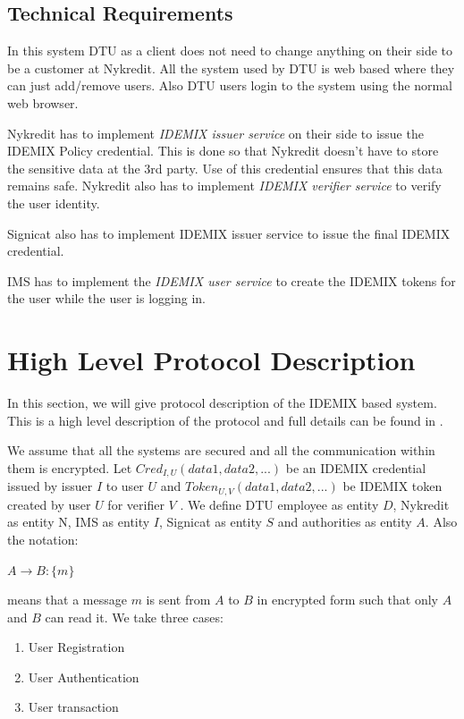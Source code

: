 \subsection{Technical Requirements}
In this system DTU as a client does not need to change anything on their side to be a customer at Nykredit. All the system used by DTU is web based where they can just add/remove users. Also DTU users login to the system using the normal web browser.

Nykredit has to implement \textit{IDEMIX issuer service}\cite{camenisch2002design} on their side to issue the IDEMIX Policy credential. This is done so that Nykredit doesn’t have to store the sensitive data at the 3rd party. Use of this credential ensures that this data remains safe. Nykredit also has to implement \textit{IDEMIX verifier service} to verify the user identity.

Signicat also has to implement IDEMIX issuer service to issue the final IDEMIX credential.

IMS has to implement the \textit{IDEMIX user service} to create the IDEMIX tokens for the user while the user is logging in.
\section{High Level Protocol Description}
In this section, we will give protocol description of the IDEMIX based system. This is a high level description of the protocol and full details can be found in \cite{camenisch2001efficient}.

We assume that all the systems are secured and all the communication within them is encrypted. Let $Cred_{I,U}(data1,data2,...)$ be an IDEMIX credential issued by issuer $I$ to user $U$ and $Token_{U,V}(data1,data2,...)$ be IDEMIX token created by user $U$ for verifier $V$ . We define DTU employee as entity $D$, Nykredit as entity N, IMS as entity $I$, Signicat as entity $S$ and authorities as entity $A$. Also the notation:
\begin{center}
$A \rightarrow B : \{m\}$
\end{center}
means that a message $m$ is sent from $A$ to $B$ in encrypted form such that only $A$ and $B$ can read it.
We take three cases:

\begin{enumerate}
\item User Registration
\item User Authentication
\item User transaction
\end{enumerate}
	
